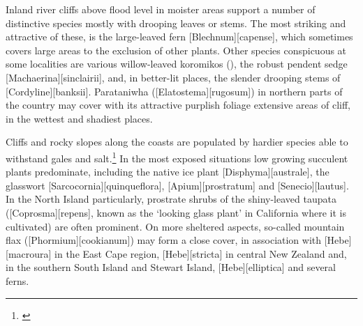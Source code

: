 Inland river cliffs above flood level in moister areas support a number of distinctive species mostly with drooping leaves or stems.
The most striking and attractive of these, is the large-leaved fern [Blechnum][capense], which sometimes covers large areas to the exclusion of other plants.
Other species conspicuous at some localities are various willow-leaved koromikos (), the robust pendent sedge [Machaerina][sinclairii], and, in better-lit places, the slender drooping stems of [Cordyline][banksii].
Parataniwha ([Elatostema][rugosum]) in northern parts of the country may cover with its attractive purplish foliage extensive areas of cliff, in the wettest and shadiest places.

Cliffs and rocky slopes along the coasts are populated by hardier species able to withstand gales and salt.\footnote{\cite{moore1963plants}}
In the most exposed situations low growing succulent plants predominate, including the native ice plant [Disphyma][australe], the glasswort [Sarcocornia][quinqueflora], [Apium][prostratum] and [Senecio][lautus].
In the North Island particularly, prostrate shrubs of the shiny-leaved taupata ([Coprosma][repens], known as the `looking glass plant' in California where it is cultivated) are often prominent.
On more sheltered aspects, so-called mountain flax ([Phormium][cookianum]) may form a close cover, in association with [Hebe][macroura] in the East Cape region, [Hebe][stricta] in central New Zealand and, in the southern South Island and Stewart Island, [Hebe][elliptica] and several ferns.

